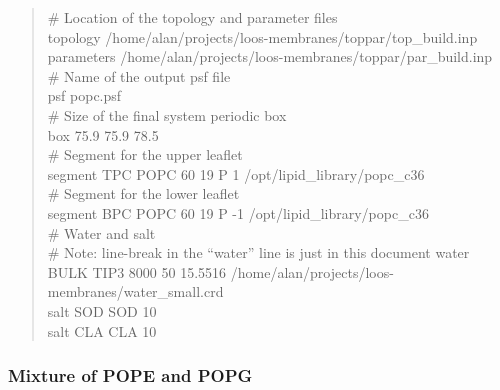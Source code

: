 \documentclass[12pt]{article}
\begin{document}
\begin{quote}
\# Location of the topology and parameter files \\
topology /home/alan/projects/loos-membranes/toppar/top\_build.inp \\
parameters /home/alan/projects/loos-membranes/toppar/par\_build.inp \\

\# Name of the output psf file \\
psf      popc.psf \\

\# Size of the final system periodic box \\
box      75.9  75.9  78.5 \\

\# Segment for the upper leaflet \\
segment TPC       POPC     60    19    P 1      /opt/lipid\_library/popc\_c36
\\
\# Segment for the lower leaflet \\
segment BPC       POPC     60    19    P -1     /opt/lipid\_library/popc\_c36
\\

\# Water and salt \\
\# Note: line-break in the ``water'' line is just in this document
water   BULK     TIP3      8000       50      15.5516
/home/alan/projects/loos-membranes/water\_small.crd \\
salt    SOD       SOD      10 \\
salt    CLA       CLA      10 \\
\end{quote}

\subsubsection{Mixture of POPE and POPG}
\end{document}
